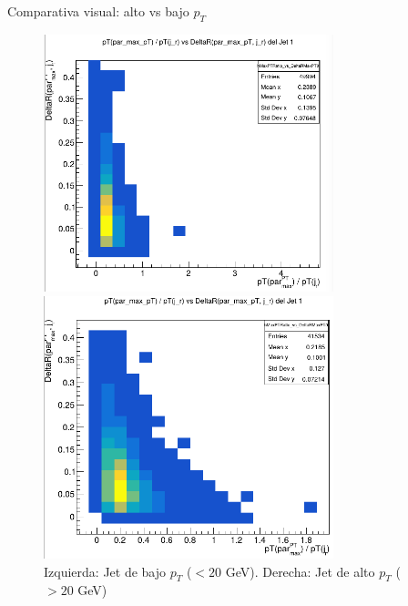 \documentclass[aspectratio=169]{beamer}
\begin{document}
\begin{frame}{Comparativa visual: alto vs bajo \texorpdfstring{$p_T$}{pT}}
  \vspace{-0.5em}
  \begin{figure}
    \centering
    \begin{minipage}{0.49\textwidth}
      \centering
      \includegraphics[width=0.75\textwidth]{lowptjet.png}
    \end{minipage}
    \hfill
    \begin{minipage}{0.49\textwidth}
      \centering
      \includegraphics[width=0.75\textwidth]{higptjet.png}
    \end{minipage}
    \caption{\footnotesize Izquierda: Jet de bajo \texorpdfstring{$p_T$}{pT} ($<20$ GeV). 
    Derecha: Jet de alto \texorpdfstring{$p_T$}{pT} ($>20$ GeV)}
  \end{figure}
\end{frame}
\end{document}
